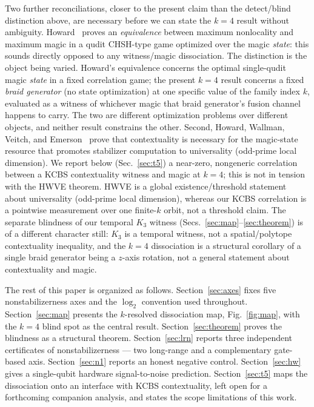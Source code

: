 \documentclass[aps,pra,twocolumn,superscriptaddress,longbibliography,floatfix,nofootinbib]{revtex4-2}
\begin{document}
Two further reconciliations, closer to the present claim than the
detect/blind distinction above, are necessary before we can state the
$k=4$ result without ambiguity. Howard~\cite{Howard2015} proves an
\emph{equivalence} between maximum nonlocality and maximum magic in a
qudit CHSH-type game optimized over the magic \emph{state}: this
sounds directly opposed to any witness/magic dissociation. The
distinction is the object being varied. Howard's equivalence concerns
the optimal single-qudit magic \emph{state} in a fixed correlation
game; the present $k=4$ result concerns a fixed \emph{braid generator}
(no state optimization) at one specific value of the family index $k$,
evaluated as a witness of whichever magic that braid generator's
fusion channel happens to carry. The two are different optimization
problems over different objects, and neither result constrains the
other. Second, Howard, Wallman, Veitch, and
Emerson~\cite{HWVE2014} prove that contextuality is necessary for the
magic-state resource that promotes stabilizer computation to
universality (odd-prime local dimension). We report below
(Sec.~\ref{sec:t5}) a near-zero, nongeneric correlation between a
KCBS contextuality witness and magic at $k=4$; this is not in tension
with the HWVE theorem. HWVE is a global existence/threshold statement
about universality (odd-prime local dimension), whereas our KCBS
correlation is a pointwise measurement over one finite-$k$ orbit, not
a threshold claim. The separate blindness of our temporal $K_3$
witness (Secs.~\ref{sec:map}--\ref{sec:theorem}) is of a different
character still: $K_3$ is a temporal witness, not a spatial/polytope
contextuality inequality, and the $k=4$ dissociation is a structural
corollary of a single braid generator being a $z$-axis rotation, not
a general statement about contextuality and magic.

The rest of this paper is organized as follows. Section~\ref{sec:axes}
fixes five nonstabilizerness axes and the $\log_2$ convention used
throughout. Section~\ref{sec:map} presents the $k$-resolved
dissociation map, Fig.~\ref{fig:map}, with the $k=4$ blind spot as the
central result. Section~\ref{sec:theorem} proves the blindness as a
structural theorem. Section~\ref{sec:lrn} reports three independent
certificates of nonstabilizerness --- two long-range and a
complementary gate-based axis. Section~\ref{sec:n1} reports
an honest negative control. Section~\ref{sec:hw} gives a
single-qubit hardware signal-to-noise prediction.
Section~\ref{sec:t5} maps the dissociation onto an interface with
KCBS contextuality, left open for a forthcoming companion analysis,
and states the scope limitations of this work.
\end{document}
